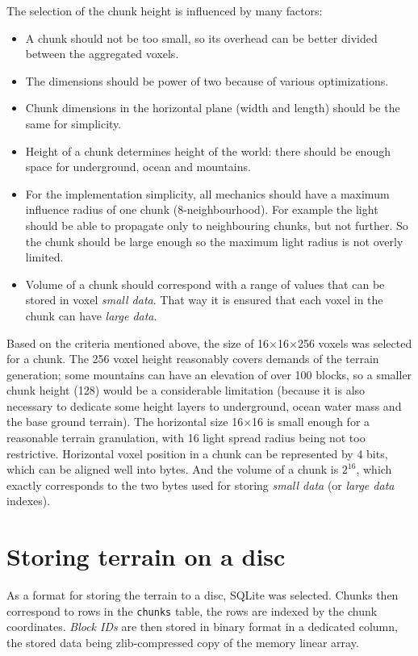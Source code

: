 The selection of the chunk height is influenced by many factors:
\begin{itemize}
	\item A chunk should not be too small, so its overhead can be better divided between the aggregated voxels.
	\item The dimensions should be power of two because of various optimizations.
	\item Chunk dimensions in the horizontal plane (width and length) should be the same for simplicity.
	\item Height of a chunk determines height of the world: there should be enough space for underground, ocean and mountains.
	\item For the implementation simplicity, all mechanics should have a maximum influence radius of one chunk (8-neighbourhood). For example the light should be able to propagate only to neighbouring chunks, but not further. So the chunk should be large enough so the maximum light radius is not overly limited.
	\item Volume of a chunk should correspond with a range of values that can be stored in voxel \textit{small data}. That way it is ensured that each voxel in the chunk can have \textit{large data}.
\end{itemize}

Based on the criteria mentioned above, the size of 16×16×256 voxels was selected for a chunk. The 256 voxel height reasonably covers demands of the terrain generation; some mountains can have an elevation of over 100 blocks, so a smaller chunk height (128) would be a considerable limitation (because it is also necessary to dedicate some height layers to underground, ocean water mass and the base ground terrain). The horizontal size 16×16 is small enough for a reasonable terrain granulation, with 16 light spread radius being not too restrictive. Horizontal voxel position in a chunk can be represented by 4 bits, which can be aligned well into bytes. And the volume of a chunk is $2^{16}$, which exactly corresponds to the two bytes used for storing \textit{small data} (or \textit{large data} indexes).

\section{Storing terrain on a disc}
As a format for storing the terrain to a disc, SQLite was selected. Chunks then correspond to rows in the \verb|chunks| table, the rows are indexed by the chunk coordinates. \textit{Block IDs} are then stored in binary format in a dedicated column, the stored data being zlib-compressed copy of the memory linear array.

